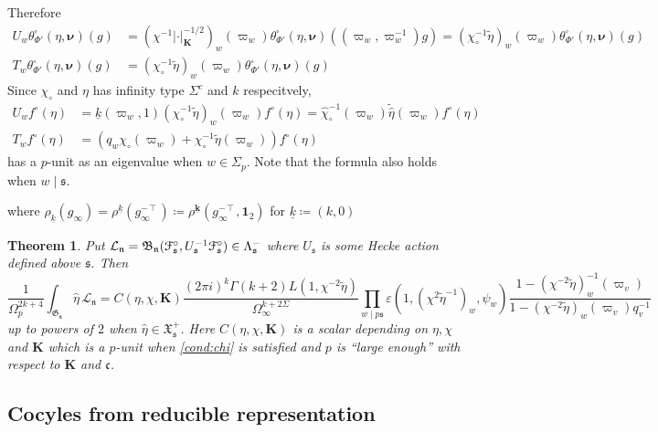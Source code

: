 \documentclass[leqno]{amsart}
\newcommand{\euF}{\EuScript{F}} %
\newcommand{\bnu}{\boldsymbol{\nu}}
\newcommand{\wt}[1]{\underline{ #1 }}
\newcommand{\bwt}[1]{\underline{\boldsymbol { #1 }}}
\newcommand{\fG}{\mathfrak{G}}
\newcommand{\fX}{\mathfrak{X}}
\newcommand{\B}{\mathfrak B}
\newcommand{\id}{\mathbf{1}}
\newcommand{\K}{{\mathbf{K}}} %
\newcommand{\fc}{\mathfrak{c}}
\newcommand{\fs}{\mathfrak{s}}
\newcommand{\fn}{\mathfrak{n}}
\newtheorem{thm}{Theorem}[section]
\theoremstyle{definition}
\theoremstyle{remark}
\begin{document}
Therefore
\begin{align*}
    U_w\theta^\square_{\Phi'}(\eta,\bnu)(g)&=
    (\chi^{-1}|\cdot|_\K^{-1/2})_w(\varpi_w)
    \theta^\square_{\Phi'}(\eta,\bnu)((\varpi_w,\varpi_w^{-1})g)
    =(\chi_\circ^{-1}\tilde{\eta})_w(\varpi_w)
    \theta^\square_{\Phi'}(\eta,\bnu)(g)\\
    T_w\theta^\square_{\Phi'}(\eta,\bnu)(g)&=
    (\chi_\circ^{-1}\tilde{\eta})_w(\varpi_w)
    \theta^\square_{\Phi'}(\eta,\bnu)(g)
\end{align*}
Since $\chi_\circ$ and $\eta$ has infinity type $\Sigma^c$ and $k$ respecitvely,
\begin{align}
    U_wf^\circ(\eta)&=
    \wt{k}(\varpi_w,1)
    (\chi_\circ^{-1}\tilde{\eta})_w(\varpi_w)f^\circ(\eta)=
    \hat{\chi}_\circ^{-1}(\varpi_w)\tilde{\hat{\eta}}(\varpi_w)f^\circ(\eta)\\
    T_wf^\circ(\eta)&=
    (q_w\chi_\circ(\varpi_w)
    +\chi_\circ^{-1}\tilde{\eta}(\varpi_w))
    f^\circ(\eta)
\end{align}
has a $p$-unit as an eigenvalue when $w\in \Sigma_p$.
Note that the formula also holds when $w\mid \fs$.


where $\rho_{\wt{k}}(g_\infty)=\rho^{\wt{k}}(g_\infty^{-\intercal})
\coloneqq \rho^{\bwt{k}}(g_\infty^{-\intercal},\id_2)$
for $\wt{k}\coloneqq (k,0)$



\begin{thm}\label{thm:intro2}
    Put $\mathcal{L}_\fn=\B_\fn(\euF^\circ_{\fs},U_\fs^{-1}\euF^\circ_{\fs})
    \in \Lambda_{\fs}^-$
    where $U_\fs$ is some Hecke action defined above $\fs$. Then
    \begin{equation*}
        \frac{1}{\Omega_p^{2k+4}}
        \int_{\fG_{\fn}}\hat{\eta}\,\mathcal{L}_\fn=
    C(\eta,\chi,\K)
    \frac{(2\pi i)^{k}\Gamma(k+2)L(1,\chi^{-2}\tilde{\eta})}{\Omega_\infty^{k+2\Sigma}}
    \prod_{w\mid p\fs}
    \varepsilon(1,(\chi^{2}\tilde{\eta}^{-1})_w,\psi_w)
    \frac{1-(\chi^{-2}\tilde{\eta})^{-1}_w(\varpi_v)}
    {1-(\chi^{-2}\tilde{\eta})_w(\varpi_v)q_v^{-1}}
    \end{equation*}
    up to powers of $2$
    when $\hat{\eta}\in \fX^+_{\fs}$.
    Here $C(\eta,\chi,\K)$ is a scalar depending on $\eta,\chi$ and $\K$
    which is a $p$-unit when \eqref{cond:chi} is satisfied 
    and $p$ is ``large enough''
    with respect to $\K$ and $\fc$. 
\end{thm}


\subsection{Cocyles from reducible representation}
\end{document}
